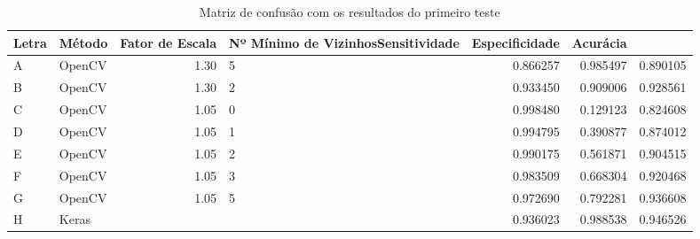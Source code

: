 \begin{table}[htbp]
    \caption{Matriz de confusão com os resultados do primeiro teste}
    \label{tab:matriz_de_confusao_teste1}
    \centering
    \begin{tabular}{llrlrrr}
        Letra & Método & Fator de Escala & Nº Mínimo de VizinhosSensitividade & Especificidade & Acurácia \\
        \midrule
             A &  OpenCV &    1.30 &               5 &                            0.866257 &        0.985497 &  0.890105 \\
             B &  OpenCV &    1.30 &               2 &                            0.933450 &        0.909006 &  0.928561 \\
             C &  OpenCV &    1.05 &               0 &                            0.998480 &        0.129123 &  0.824608 \\
             D &  OpenCV &    1.05 &               1 &                            0.994795 &        0.390877 &  0.874012 \\
             E &  OpenCV &    1.05 &               2 &                            0.990175 &        0.561871 &  0.904515 \\
             F &  OpenCV &    1.05 &               3 &                            0.983509 &        0.668304 &  0.920468 \\
             G &  OpenCV &    1.05 &               5 &                            0.972690 &        0.792281 &  0.936608 \\
             H &   Keras &         &                 &                            0.936023 &        0.988538 &  0.946526 \\
        \end{tabular}
\end{table}

